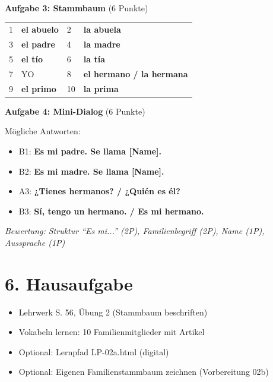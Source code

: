 \documentclass[11pt, a4paper]{article}
\newcommand{\loesung}[1]{\textcolor{loesung}{\textbf{#1}}}
\begin{document}
\vspace{1em}

\textbf{Aufgabe 3: Stammbaum} (6 Punkte)

\begin{tabular}{ll|ll}
1 & \loesung{el abuelo} & 2 & \loesung{la abuela} \\
3 & \loesung{el padre} & 4 & \loesung{la madre} \\
5 & \loesung{el tío} & 6 & \loesung{la tía} \\
7 & YO & 8 & \loesung{el hermano / la hermana} \\
9 & \loesung{el primo} & 10 & \loesung{la prima} \\
\end{tabular}

\vspace{1em}

\textbf{Aufgabe 4: Mini-Dialog} (6 Punkte)

Mögliche Antworten:
\begin{itemize}
    \item B1: \loesung{Es mi padre. Se llama [Name].}
    \item B2: \loesung{Es mi madre. Se llama [Name].}
    \item A3: \loesung{¿Tienes hermanos? / ¿Quién es él?}
    \item B3: \loesung{Sí, tengo un hermano. / Es mi hermano.}
\end{itemize}

\textit{Bewertung: Struktur ``Es mi...'' (2P), Familienbegriff (2P), Name (1P), Aussprache (1P)}


\section*{6. Hausaufgabe}

\begin{itemize}
    \item Lehrwerk S. 56, Übung 2 (Stammbaum beschriften)
    \item Vokabeln lernen: 10 Familienmitglieder mit Artikel
    \item Optional: Lernpfad LP-02a.html (digital)
    \item Optional: Eigenen Familienstammbaum zeichnen (Vorbereitung 02b)
\end{itemize}
\end{document}
